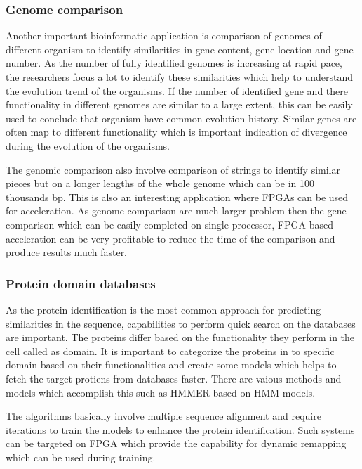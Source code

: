 \documentclass[12pt,twoside]{article}
\begin{document}
\subsubsection{Genome comparison}

Another important bioinformatic application is comparison of genomes of different organism to identify similarities
in gene content, gene location and gene number. As the number of fully identified genomes is increasing at rapid pace,
the researchers focus a lot to identify these similarities which help to understand the evolution trend of the organisms.
If the number of identified gene and there functionality in different genomes are similar to a large extent, this can be
easily used to conclude that organism have common evolution history. Similar genes are often map to different functionality
which is important indication of divergence during the evolution of the organisms. 

The genomic comparison also involve comparison of strings to identify similar pieces but on a longer lengths of the whole
genome which can be in 100 thousands bp. This is also an interesting application where FPGAs can be used for acceleration.
As genome comparison are much larger problem then the gene comparison which can be easily completed on single processor,
FPGA based acceleration can be very profitable to reduce the time of the comparison and produce results much faster.

\subsubsection{Protein domain databases}

As the protein identification is the most common approach for predicting similarities in the sequence, capabilities
to perform quick search on the databases are important. The proteins differ based on the functionality they perform in
the cell called as domain. It is important to categorize the proteins in to specific domain based on their functionalities
and create some models which helps to fetch the target protiens from databases faster. There are vaious methods and models
which accomplish this such as HMMER based on HMM models.

The algorithms basically involve multiple sequence alignment and require iterations to train the models to enhance
the protein identification. Such systems can be targeted on FPGA which provide the capability for dynamic remapping
which can be used during training.
\end{document}
